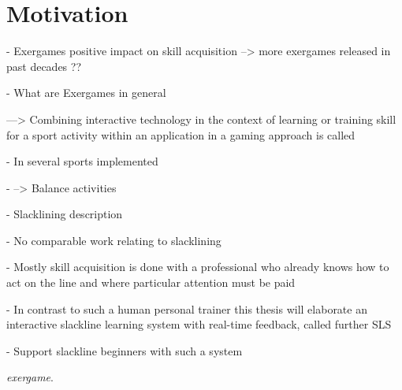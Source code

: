 \section{Motivation}
- Exergames positive impact on skill acquisition --> more exergames released in past decades ??

- What are Exergames in general

---> Combining interactive technology in the context of learning or training skill for a sport activity within an application in a gaming approach is called

- In several sports implemented

- --> Balance activities

- Slacklining description

- No comparable work relating to slacklining

- Mostly skill acquisition is done with a professional who already knows how to act on the line and where particular attention must be paid

- In contrast to such a human personal trainer this thesis will elaborate an interactive slackline learning system with real-time feedback, called further SLS

- Support slackline beginners with such a system

 \textit{exergame}.

